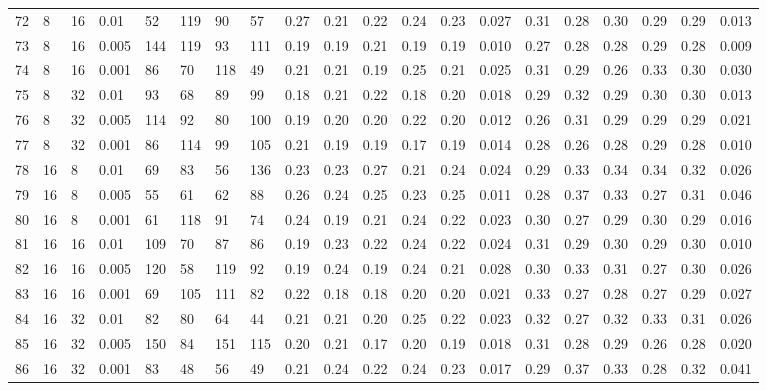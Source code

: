 \begin{landscape}
\begin{longtable}{llllllllllllllllllll}
72 & 8  & 16 & 0.01  & 52  & 119 & 90  & 57  & 0.27 & 0.21 & 0.22 & 0.24 & 0.23 & 0.027 & 0.31 & 0.28 & 0.30 & 0.29 & 0.29 & 0.013 \\
73 & 8  & 16 & 0.005 & 144 & 119 & 93  & 111 & 0.19 & 0.19 & 0.21 & 0.19 & 0.19 & 0.010 & 0.27 & 0.28 & 0.28 & 0.29 & 0.28 & 0.009 \\
74 & 8  & 16 & 0.001 & 86  & 70  & 118 & 49  & 0.21 & 0.21 & 0.19 & 0.25 & 0.21 & 0.025 & 0.31 & 0.29 & 0.26 & 0.33 & 0.30 & 0.030 \\
75 & 8  & 32 & 0.01  & 93  & 68  & 89  & 99  & 0.18 & 0.21 & 0.22 & 0.18 & 0.20 & 0.018 & 0.29 & 0.32 & 0.29 & 0.30 & 0.30 & 0.013 \\
76 & 8  & 32 & 0.005 & 114 & 92  & 80  & 100 & 0.19 & 0.20 & 0.20 & 0.22 & 0.20 & 0.012 & 0.26 & 0.31 & 0.29 & 0.29 & 0.29 & 0.021 \\
77 & 8  & 32 & 0.001 & 86  & 114 & 99  & 105 & 0.21 & 0.19 & 0.19 & 0.17 & 0.19 & 0.014 & 0.28 & 0.26 & 0.28 & 0.29 & 0.28 & 0.010 \\
78 & 16 & 8  & 0.01  & 69  & 83  & 56  & 136 & 0.23 & 0.23 & 0.27 & 0.21 & 0.24 & 0.024 & 0.29 & 0.33 & 0.34 & 0.34 & 0.32 & 0.026 \\
79 & 16 & 8  & 0.005 & 55  & 61  & 62  & 88  & 0.26 & 0.24 & 0.25 & 0.23 & 0.25 & 0.011 & 0.28 & 0.37 & 0.33 & 0.27 & 0.31 & 0.046 \\
80 & 16 & 8  & 0.001 & 61  & 118 & 91  & 74  & 0.24 & 0.19 & 0.21 & 0.24 & 0.22 & 0.023 & 0.30 & 0.27 & 0.29 & 0.30 & 0.29 & 0.016 \\
81 & 16 & 16 & 0.01  & 109 & 70  & 87  & 86  & 0.19 & 0.23 & 0.22 & 0.24 & 0.22 & 0.024 & 0.31 & 0.29 & 0.30 & 0.29 & 0.30 & 0.010 \\
82 & 16 & 16 & 0.005 & 120 & 58  & 119 & 92  & 0.19 & 0.24 & 0.19 & 0.24 & 0.21 & 0.028 & 0.30 & 0.33 & 0.31 & 0.27 & 0.30 & 0.026 \\
83 & 16 & 16 & 0.001 & 69  & 105 & 111 & 82  & 0.22 & 0.18 & 0.18 & 0.20 & 0.20 & 0.021 & 0.33 & 0.27 & 0.28 & 0.27 & 0.29 & 0.027 \\
84 & 16 & 32 & 0.01  & 82  & 80  & 64  & 44  & 0.21 & 0.21 & 0.20 & 0.25 & 0.22 & 0.023 & 0.32 & 0.27 & 0.32 & 0.33 & 0.31 & 0.026 \\
85 & 16 & 32 & 0.005 & 150 & 84  & 151 & 115 & 0.20 & 0.21 & 0.17 & 0.20 & 0.19 & 0.018 & 0.31 & 0.28 & 0.29 & 0.26 & 0.28 & 0.020 \\
86 & 16 & 32 & 0.001 & 83  & 48  & 56  & 49  & 0.21 & 0.24 & 0.22 & 0.24 & 0.23 & 0.017 & 0.29 & 0.37 & 0.33 & 0.28 & 0.32 & 0.041 \\

\end{longtable}
\end{landscape}
